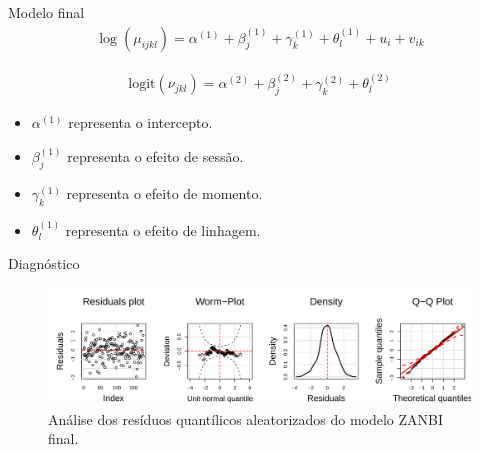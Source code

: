 \documentclass[
  ignorenonframetext,
  serif,
  professionalfont,
  usenames,
  dvipsnames,
  aspectratio = 169]{beamer}
\providecommand{\tightlist}{%
  \setlength{\itemsep}{0pt}\setlength{\parskip}{0pt}}
\renewcommand{\tightlist}{%
  \setlength{\itemsep}{0\baselineskip}
  \setlength{\parskip}{0.25\baselineskip}
}
\begin{document}
\begin{frame}{Modelo final}
\protect\hypertarget{modelo-final}{}
\begin{equation}
    \begin{aligned}
        \log(\mu_{ijkl}) = \alpha^{(1)} + \beta_{j}^{(1)} + \gamma_{k}^{(1)} + \theta_{l}^{(1)} + u_{i} + v_{ik}
    \end{aligned}
    \label{eq.count.mu}
\end{equation}

\begin{equation}
    \begin{aligned}
        \text{logit}(\nu_{jkl}) = \alpha^{(2)} + \beta_{j}^{(2)} + \gamma_{k}^{(2)} + \theta_{l}^{(2)}
    \end{aligned}
    \label{eq.count.nu}
\end{equation}

\begin{itemize}
\tightlist
\item
  \(\alpha^{(1)}\) representa o intercepto.
\item
  \(\beta_{j}^{(1)}\) representa o efeito de sessão.
\item
  \(\gamma_{k}^{(1)}\) representa o efeito de momento.
\item
  \(\theta_{l}^{(1)}\) representa o efeito de linhagem.
\end{itemize}
\end{frame}

\begin{frame}{Diagnóstico}
\protect\hypertarget{diagnuxf3stico}{}
\begin{figure}

{\centering \includegraphics[width=0.95\linewidth]{./img/mzanbi} 

}

\caption{Análise dos resíduos quantílicos aleatorizados do modelo ZANBI final.}\label{fig:unnamed-chunk-11}
\end{figure}
\end{frame}
\end{document}
